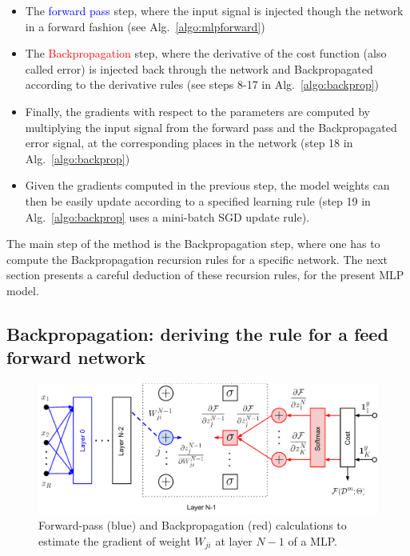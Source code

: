 \begin{itemize}
\item The \textcolor{blue}{forward pass} step, where the input signal is injected though the network  in a forward fashion (see Alg.~\ref{algo:mlpforward})
\item The \textcolor{red}{Backpropagation} step, where the derivative of the cost function (also called error) is injected back through the network and Backpropagated according to the derivative rules (see steps 8-17 in Alg.~\ref{algo:backprop})
\item Finally, the gradients with respect to the parameters are computed by multiplying the input signal from the forward pass and the Backpropagated error signal, at the corresponding places in the network (step 18 in Alg.~\ref{algo:backprop})
\item Given the gradients computed in the previous step, the model weights can then be easily update according to a specified learning rule (step 19 in Alg.~\ref{algo:backprop} uses a mini-batch SGD update rule).
\end{itemize}

The main step of the method is the Backpropagation step, where one has to compute the Backpropagation recursion rules for a specific network.
The next section presents a careful deduction of these recursion rules, for the present MLP model.

\subsection{Backpropagation: deriving the rule for a feed forward network}

\begin{figure}[!h]
\centering
\includegraphics[scale=0.6]{figs/deep_learning/NN_backprop_colored2.pdf}
\caption{Forward-pass (blue) and Backpropagation (red) calculations to estimate the gradient of weight $W_{ji}$ at layer $N-1$ of a MLP.}
\label{fig:NN_color}
\end{figure}

